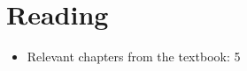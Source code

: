 \documentclass[notes=show]{beamer}
\begin{document}
\section{Reading}

\begin{frame}%


\begin{itemize}
\item Relevant chapters from the textbook: 5
\end{itemize}

\end{frame}%
\end{document}
